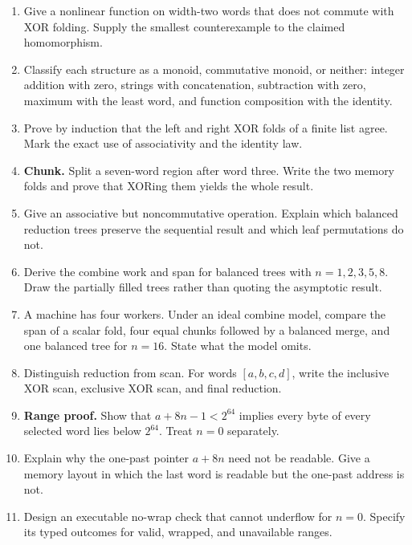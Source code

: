\begin{enumerate}
\item Give a nonlinear function on width-two words that does not commute with
XOR folding. Supply the smallest counterexample to the claimed homomorphism.

\item Classify each structure as a monoid, commutative monoid, or neither:
integer addition with zero, strings with concatenation, subtraction with zero,
maximum with the least word, and function composition with the identity.

\item Prove by induction that the left and right XOR folds of a finite list
agree. Mark the exact use of associativity and the identity law.

\item \textbf{Chunk.} Split a seven-word region after word three. Write the
two memory folds and prove that XORing them yields the whole result.

\item Give an associative but noncommutative operation. Explain which balanced
reduction trees preserve the sequential result and which leaf permutations do
not.

\item Derive the combine work and span for balanced trees with
\(n=1,2,3,5,8\). Draw the partially filled trees rather than quoting the
asymptotic result.

\item A machine has four workers. Under an ideal combine model, compare the
span of a scalar fold, four equal chunks followed by a balanced merge, and one
balanced tree for \(n=16\). State what the model omits.

\item Distinguish reduction from scan. For words \([a,b,c,d]\), write the
inclusive XOR scan, exclusive XOR scan, and final reduction.

\item \textbf{Range proof.} Show that \(a+8n-1<2^{64}\) implies every byte
of every selected word lies below \(2^{64}\). Treat \(n=0\) separately.

\item Explain why the one-past pointer \(a+8n\) need not be readable. Give a
memory layout in which the last word is readable but the one-past address is
not.

\item Design an executable no-wrap check that cannot underflow for \(n=0\).
Specify its typed outcomes for valid, wrapped, and unavailable ranges.


\end{enumerate}

